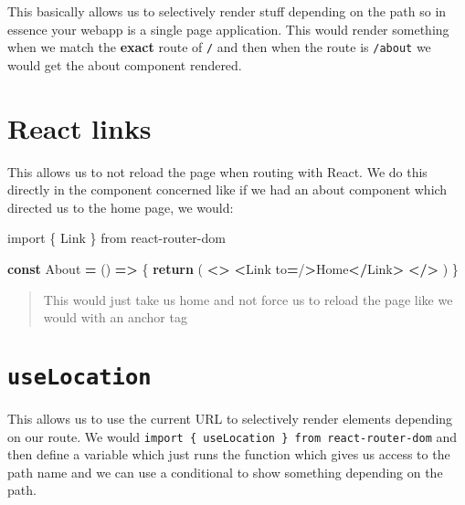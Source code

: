 \documentclass[
]{report}
\newenvironment{Shaded}{\begin{snugshade}}{\end{snugshade}}
\newcommand{\ControlFlowTok}[1]{\textcolor[rgb]{0.13,0.29,0.53}{\textbf{#1}}}
\newcommand{\ImportTok}[1]{#1}
\newcommand{\KeywordTok}[1]{\textcolor[rgb]{0.13,0.29,0.53}{\textbf{#1}}}
\newcommand{\NormalTok}[1]{#1}
\newcommand{\OperatorTok}[1]{\textcolor[rgb]{0.81,0.36,0.00}{\textbf{#1}}}
\newcommand{\StringTok}[1]{\textcolor[rgb]{0.31,0.60,0.02}{#1}}
\begin{document}
This basically allows us to selectively render stuff depending on the path so
in essence your webapp is a single page application. This would render
something when we match the \textbf{exact} route of \texttt{/} and then when the route is
\texttt{/about} we would get the about component rendered.

\hypertarget{react-links}{%
\section{React links}\label{react-links}}

This allows us to not reload the page when routing with React. We do this
directly in the component concerned like if we had an about component which
directed us to the home page, we would:

\begin{Shaded}
\begin{Highlighting}[]
\ImportTok{import}\NormalTok{ \{ Link \} }\ImportTok{from} \StringTok{\textquotesingle{}react{-}router{-}dom\textquotesingle{}}

\KeywordTok{const}\NormalTok{ About }\OperatorTok{=}\NormalTok{ () }\KeywordTok{=\textgreater{}}\NormalTok{ \{}
    \ControlFlowTok{return}\NormalTok{ (}
        \OperatorTok{\textless{}\textgreater{}}
            \OperatorTok{\textless{}}\NormalTok{Link to}\OperatorTok{=}\StringTok{\textquotesingle{}/\textquotesingle{}}\OperatorTok{\textgreater{}}\NormalTok{Home}\OperatorTok{\textless{}/}\NormalTok{Link}\OperatorTok{\textgreater{}}
        \OperatorTok{\textless{}/\textgreater{}}
\NormalTok{    )}
\NormalTok{\}}
\end{Highlighting}
\end{Shaded}

\begin{quote}
This would just take us home and not force us to reload the page like we
would with an anchor tag
\end{quote}

\hypertarget{uselocation}{%
\section{\texorpdfstring{\texttt{useLocation}}{useLocation}}\label{uselocation}}

This allows us to use the current URL to selectively render elements depending
on our route. We would \texttt{import\ \{\ useLocation\ \}\ from\ \textquotesingle{}react-router-dom\textquotesingle{}} and
then define a variable which just runs the function which gives us access to
the path name and we can use a conditional to show something depending on the
path.

  
\end{document}
